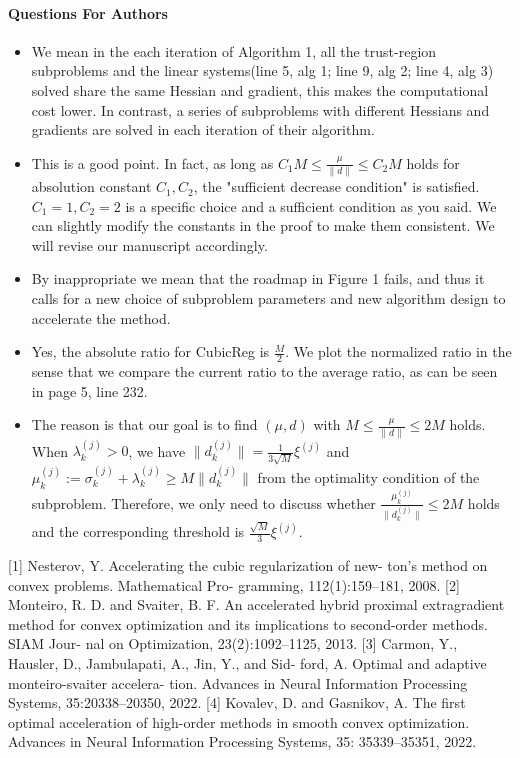 \documentclass{article}
\begin{document}
\paragraph{Questions For Authors}
\begin{itemize}
    \item We mean in the each iteration of Algorithm 1, all the trust-region subproblems and the linear systems(line 5, alg 1; line 9, alg 2; line 4, alg 3) solved share the same Hessian and gradient, this makes the computational cost lower. In contrast, a series of subproblems with different Hessians and gradients are solved in each iteration of their algorithm.
    \item This is a good point. In fact, as long as $C_1 M \leq \frac{\mu}{\|d\|} \leq C_2 M$ holds for absolution constant $C_1, C_2$, the "sufficient decrease condition" is satisfied. $C_1 = 1,C_2=2$ is a specific choice and a sufficient condition as you said. We can slightly modify the constants in the proof to make them consistent. We will revise our manuscript accordingly.
    \item By inappropriate we mean that the roadmap in Figure 1 fails, and thus it calls for a new choice of subproblem parameters and new algorithm design to accelerate the method.
    \item Yes, the absolute ratio for CubicReg is $\frac{M}{2}$. We plot the normalized ratio in the sense that we compare the current ratio to the average ratio, as can be seen in page 5, line 232.
    \item The reason is that our goal is to find $(\mu,d)$ with $M\leq \frac{\mu}{\|d\|}\leq 2M$ holds. When $\lambda_k^{(j)} >0$, we have $\|d_k^{(j)}\|  = \frac{1}{3\sqrt{M}}\xi^{(j)}$ and $\mu_k^{(j)} := \sigma_k^{(j)}+\lambda_k^{(j)} \geq M\|d_k^{(j)}\|$ from the optimality condition of the subproblem. Therefore, we only need to discuss whether $\frac{\mu_k^{(j)}}{\|d_k^{(j)}\|}\leq 2M$ holds and the corresponding threshold is $\frac{\sqrt{M}}{3}\xi^{(j)}$.
\end{itemize}
[1] Nesterov, Y. Accelerating the cubic regularization of new-
ton’s method on convex problems. Mathematical Pro-
gramming, 112(1):159–181, 2008.
[2] Monteiro, R. D. and Svaiter, B. F. An accelerated hybrid
proximal extragradient method for convex optimization
and its implications to second-order methods. SIAM Jour-
nal on Optimization, 23(2):1092–1125, 2013.
[3] Carmon, Y., Hausler, D., Jambulapati, A., Jin, Y., and Sid-
ford, A. Optimal and adaptive monteiro-svaiter accelera-
tion. Advances in Neural Information Processing Systems,
35:20338–20350, 2022.
[4] Kovalev, D. and Gasnikov, A. The first optimal acceleration
of high-order methods in smooth convex optimization.
Advances in Neural Information Processing Systems, 35:
35339–35351, 2022.
\end{document}
